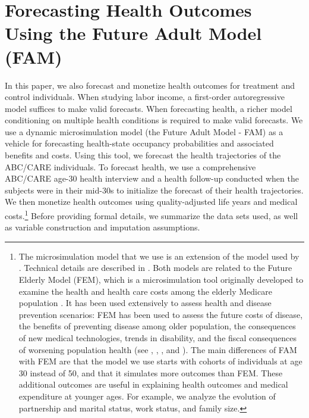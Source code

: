 \section{Forecasting Health Outcomes Using the Future Adult Model (FAM)} \label{appendix:health}

In this paper, we also forecast and monetize health outcomes for treatment and control individuals. When studying labor income, a first-order autoregressive model suffices to make valid forecasts. When forecasting health, a richer model conditioning on multiple health conditions is required to make valid forecasts. We use a dynamic microsimulation model (the Future Adult Model - FAM) as a vehicle for forecasting health-state occupancy probabilities and associated benefits and costs. Using this tool, we forecast the health trajectories of the ABC/CARE individuals. To forecast health, we use a comprehensive ABC/CARE age-30 health interview and a health follow-up conducted when the subjects were in their mid-30s to initialize the forecast of their health trajectories. We then monetize health outcomes using quality-adjusted life years and medical costs.\footnote{The  microsimulation model that we use is an extension of the model used by \citet{Prados_etal_2015_How-Much-Can-Education}. Technical details are described in \citet{Goldman_etal_2015_Future-Adult-Model}. Both models are related to the Future Elderly Model (FEM), which is a microsimulation tool originally developed to examine the health and health care costs among the elderly Medicare population \citep{Goldman_etal_2004_RAND-Report_Health-Status-Elderly}. It has been used extensively to assess health and disease prevention scenarios: FEM has been used to assess the future costs of disease, the benefits of preventing disease among older population, the consequences of new medical technologies, trends in disability, and the fiscal consequences of worsening population health (see \citet{Goldman_etal_2004_RAND-Report_Health-Status-Elderly}, \citet{Lakdawalla_etal_2004_Health-and-Cost}, \citet{Goldman_etal_2005_HA}, and \citet{Zissimopoulos_etal_2014_Delaying-Alzheimers}). The main differences of FAM with FEM are that the model we use starts with cohorts of individuals at age 30 instead of 50, and that it simulates more outcomes than FEM. These additional outcomes are useful in explaining health outcomes and medical expenditure at younger ages. For example, we analyze the evolution of partnership and marital status, work status, and family size.} Before providing formal details, we summarize the data sets used, as well as variable construction and imputation assumptions. 


